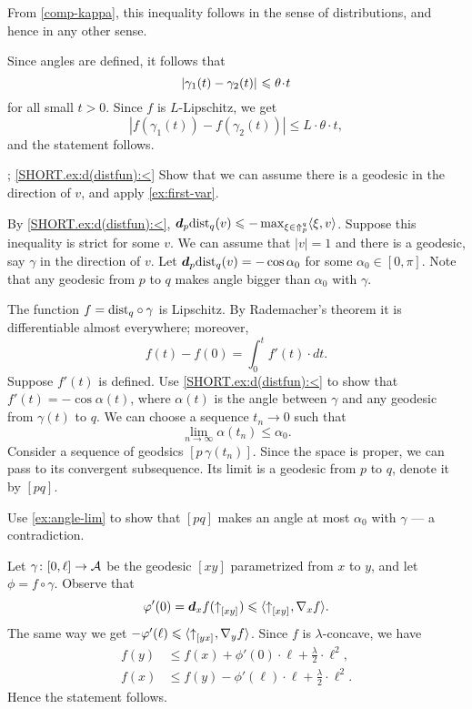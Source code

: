  From \ref{comp-kappa}, this inequality follows in the sense of distributions, and hence in any other sense.

Since angles are defined, it follows that 
\[\dist{\gamma_1(t)}{\gamma_2(t)}{}\le \theta\cdot t\]
for all small $t>0$.     
Since $f$ is $L$-Lipschitz, we get 
\[|f(\gamma_1(t))-f(\gamma_2(t))|\le L\cdot \theta\cdot t,\]
and the statement follows.

\parbf{\ref{ex:d(distfun)}}; \ref{SHORT.ex:d(distfun):<}
Show that we can assume there is a geodesic in the direction of $v$, and apply \ref{ex:first-var}.

By \ref{SHORT.ex:d(distfun):<}, $\bm{d}_p\mathrm{dist}_q(v)\leqslant-\max_{\xi\in\Uparrow_p^q}\langle\xi,v\rangle$.
Suppose this inequality is strict for some $v$.
We can assume that $|v|=1$ and there is a geodesic, say $\gamma$ in the direction of $v$.
Let $\bm{d}_p\mathrm{dist}_q(v)=-\cos\alpha_0$ for some $\alpha_0\in [0,\pi]$.
Note that any geodesic from $p$ to $q$ makes angle bigger than $\alpha_0$ with $\gamma$.

The function $f=\mathrm{dist}_q\circ\gamma$ is Lipschitz.
By Rademacher's theorem it is differentiable almost everywhere;
moreover, 
\[f(t)-f(0)=\int_0^t f'(t)\cdot dt.\]
Suppose $f'(t)$ is defined.
Use \ref{SHORT.ex:d(distfun):<} to show that 
$f'(t)=-\cos\alpha(t)$, where $\alpha(t)$ is the angle between $\gamma$ and any geodesic from $\gamma(t)$ to $q$.
We can choose a sequence $t_n\to 0$ such that 
\[\lim_{n\to\infty}\alpha(t_n) \le \alpha_0.\]
Consider a sequence of geodsics $[p\,\gamma(t_n)]$.
Since the space is proper, we can pass to its convergent subsequence.
Its limit is a geodesic from $p$ to $q$, denote it by $[pq]$.

Use \ref{ex:angle-lim} to show that $[pq]$ makes an angle at most $\alpha_0$ with $\gamma$ --- a contradiction.
 
Let $\gamma\colon[0,\ell]\to \mathcal{A}$ be the geodesic $[xy]$ parametrized from $x$ to $y$,
and let $\phi=f\circ\gamma$.
Observe that 
\[\varphi'(0)=\bm{d}_xf({\uparrow}_{[{x}{y}]_{{}}})\leqslant \langle{\uparrow}_{[{x}{y}]_{{}}},\nabla_{x}f\rangle.\]
The same way we get $-\varphi'(\ell)\leqslant \langle{\uparrow}_{[{y}{x}]_{{}}},\nabla_{y}f\rangle$.
Since $f$ is $\lambda$-concave, we have
\begin{align*}
f(y)&\le f(x)+\phi'(0)\cdot \ell+\tfrac\lambda2\cdot\ell^2,
\\
f(x)&\le f(y)-\phi'(\ell)\cdot \ell+\tfrac\lambda2\cdot\ell^2.
\end{align*}
Hence the statement follows.

